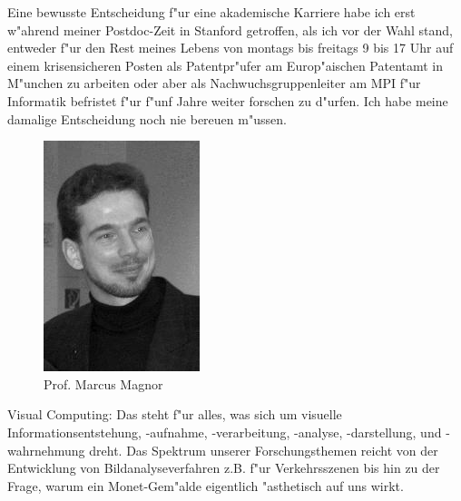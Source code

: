 Eine bewusste Entscheidung f"ur eine akademische Karriere habe ich erst w"ahrend meiner Postdoc-Zeit in Stanford getroffen, als ich vor der Wahl stand, entweder f"ur den Rest meines Lebens von montags bis freitags 9 bis 17 Uhr auf einem krisensicheren Posten als Patentpr"ufer am Europ"aischen Patentamt in M"unchen zu arbeiten oder aber als Nachwuchsgruppenleiter am MPI f"ur Informatik befristet f"ur f"unf Jahre weiter forschen zu d"urfen. Ich habe meine damalige Entscheidung noch nie bereuen m"ussen.

\begin{figure}[h]
	\centering\includegraphics[width=0.7\linewidth]{bilder/dozenten/magnor.jpg}\\
	Prof. Marcus Magnor
\end{figure}


Visual Computing: Das steht f"ur alles, was sich um visuelle Informationsentstehung, -aufnahme, -verarbeitung, -analyse, -darstellung, und -wahrnehmung dreht. Das Spektrum unserer Forschungsthemen reicht von der Entwicklung von Bildanalyseverfahren z.B. f"ur Verkehrsszenen bis hin zu der Frage, warum ein Monet-Gem"alde eigentlich "asthetisch auf uns wirkt.

